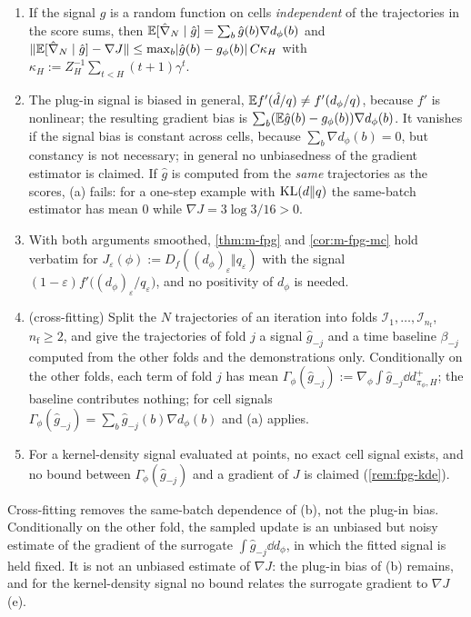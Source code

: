 \begin{proposition}\label{prop:m-fpg-approx}
\begin{enumerate}[nosep,label=(\alph*)]
\item If the signal $\hat g$ is a random function on cells \emph{independent} of the trajectories in the score sums, then $\mathbb{E}[\hat\nabla_N\mid\hat g]=\sum_b\hat g(b)\nabla d_\phi(b)$ and $\lVert\mathbb{E}[\hat\nabla_N\mid\hat g]-\nabla J\rVert\le\max_b\lvert\hat g(b)-g_\phi(b)\rvert\,C\kappa_H$ with $\kappa_H:=Z_H^{-1}\sum_{t<H}(t+1)\gamma^t$.
\item The plug-in signal is biased in general, $\mathbb{E} f'(\hat d/q)\ne f'(d_\phi/q)$, because $f'$ is nonlinear; the resulting gradient bias is $\sum_b(\mathbb{E}\hat g(b)-g_\phi(b))\nabla d_\phi(b)$. It vanishes if the signal bias is constant across cells, because $\sum_b\nabla d_\phi(b)=0$, but constancy is not necessary; in general no unbiasedness of the gradient estimator is claimed. If $\hat g$ is computed from the \emph{same} trajectories as the scores, (a) fails: for a one-step example with $\mathrm{KL}(d\Vert q)$ the same-batch estimator has mean $0$ while $\nabla J=3\log3/16>0$.
\item With both arguments smoothed, \cref{thm:m-fpg} and \cref{cor:m-fpg-mc} hold verbatim for $J_\varepsilon(\phi):=D_f((d_\phi)_\varepsilon\Vert q_\varepsilon)$ with the signal $(1-\varepsilon)f'\big((d_\phi)_\varepsilon/q_\varepsilon\big)$, and no positivity of $d_\phi$ is needed.
\item (cross-fitting) Split the $N$ trajectories of an iteration into folds $\mathcal I_1,\dots,\mathcal I_{n_{\mathrm f}}$, $n_{\mathrm f}\ge2$, and give the trajectories of fold $j$ a signal $\hat g_{-j}$ and a time baseline $\beta_{-j}$ computed from the other folds and the demonstrations only. Conditionally on the other folds, each term of fold $j$ has mean $\Gamma_\phi(\hat g_{-j}):=\nabla_\phi\int\hat g_{-j}\dd d^+_{\pi_\phi,H}$; the baseline contributes nothing; for cell signals $\Gamma_\phi(\hat g_{-j})=\sum_b\hat g_{-j}(b)\nabla d_\phi(b)$ and (a) applies.
\item For a kernel-density signal evaluated at points, no exact cell signal exists, and no bound between $\Gamma_\phi(\hat g_{-j})$ and a gradient of $J$ is claimed (\cref{rem:fpg-kde}).
\end{enumerate}
\end{proposition}

Cross-fitting \citep[in the spirit of][]{chernozhukov2018double} removes the same-batch dependence of (b), not the plug-in bias. Conditionally on the other fold, the sampled update is an unbiased but noisy estimate of the gradient of the surrogate $\int\hat g_{-j}\dd d_\phi$, in which the fitted signal is held fixed. It is not an unbiased estimate of $\nabla J$: the plug-in bias of (b) remains, and for the kernel-density signal no bound relates the surrogate gradient to $\nabla J$ (e).

